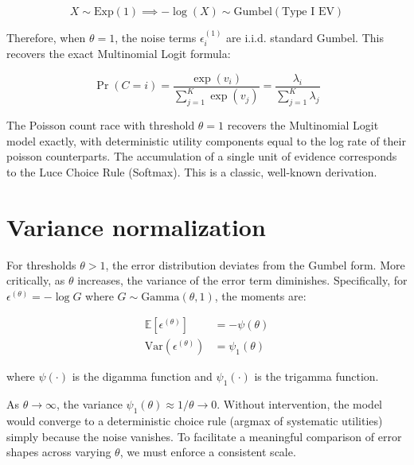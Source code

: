 \documentclass[
  man,
  floatsintext,
  longtable,
  a4paper,
  nolmodern,
  notxfonts,
  notimes,
  colorlinks=true,linkcolor=blue,citecolor=blue,urlcolor=blue]{apa7}
\begin{document}
\[
X \sim \text{Exp}(1) \implies -\log(X) \sim \text{Gumbel}(\text{Type I EV})
\]

Therefore, when \(\theta=1\), the noise terms \(\epsilon_i^{(1)}\) are
i.i.d. standard Gumbel. This recovers the exact Multinomial Logit
formula:

\[
\Pr(C=i) = \frac{\exp(v_i)}{\sum_{j=1}^K \exp(v_j)} = \frac{\lambda_i}{\sum_{j=1}^K \lambda_j}
\]

\begin{tcolorbox}[enhanced jigsaw, colframe=quarto-callout-note-color-frame, coltitle=black, leftrule=.75mm, opacitybacktitle=0.6, colback=white, arc=.35mm, left=2mm, opacityback=0, toptitle=1mm, rightrule=.15mm, bottomtitle=1mm, breakable, colbacktitle=quarto-callout-note-color!10!white, titlerule=0mm, bottomrule=.15mm, title={Result 2 (Logit Boundary)}, toprule=.15mm]

The Poisson count race with threshold \(\theta=1\) recovers the
Multinomial Logit model exactly, with deterministic utility components
equal to the log rate of their poisson counterparts. The accumulation of
a single unit of evidence corresponds to the Luce Choice Rule (Softmax).
This is a classic, well-known derivation.

\end{tcolorbox}

\section{Variance normalization}\label{sec-variance-normalization}

For thresholds \(\theta > 1\), the error distribution deviates from the
Gumbel form. More critically, as \(\theta\) increases, the variance of
the error term diminishes. Specifically, for
\(\epsilon^{(\theta)} = -\log G\) where
\(G \sim \text{Gamma}(\theta, 1)\), the moments are:

\[
\begin{aligned} \mathbb{E}[\epsilon^{(\theta)}] &= -\psi(\theta) \\ \text{Var}(\epsilon^{(\theta)}) &= \psi_1(\theta) \end{aligned}
\]

where \(\psi(\cdot)\) is the digamma function and \(\psi_1(\cdot)\) is
the trigamma function.

As \(\theta \to \infty\), the variance
\(\psi_1(\theta) \approx 1/\theta \to 0\). Without intervention, the
model would converge to a deterministic choice rule (argmax of
systematic utilities) simply because the noise vanishes. To facilitate a
meaningful comparison of error shapes across varying \(\theta\), we must
enforce a consistent scale.
\end{document}

